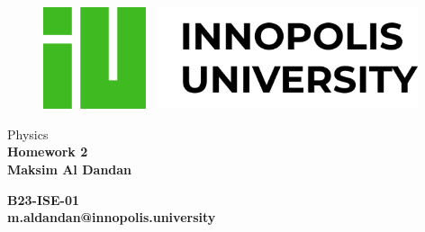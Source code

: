\begin{titlepage}
\begin{figure}[t]
    \centering\includegraphics[width=0.98\textwidth]{innou-logo.png}
\end{figure}
\vspace{20mm}

\begin{Large}
 \begin{center}
	\vspace{20mm}
    {\LARGE{Physics}}\\
	\vspace{10mm}
	{\huge{\bf Homework 2}}\\
	\vspace{10mm}
	{{\bf Maksim Al Dandan}}\\
\end{center}
\end{Large}


\vspace{36mm}

\begin{center}
    {\large{\bf B23-ISE-01\\m.aldandan@innopolis.university}}
\end{center}
	

\vspace{25mm}

\hrulefill

\vspace{5mm}
\end{titlepage}